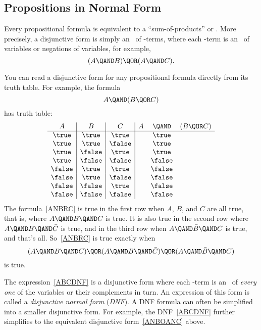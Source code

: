 \subsection{Propositions in Normal Form}\label{normal_form_sec}
Every propositional formula is equivalent to a ``sum-of-products''
or .  More precisely, a disjunctive form is
simply an \QOR\ of \QAND-terms, where each \QAND-term is an \QAND\ of
variables or negations of variables, for example, 
\begin{equation}\label{ANBOANC}
(A \QAND B) \QOR (A \QAND C).
\end{equation}

You can read a disjunctive form for any propositional formula directly
from its truth table.  For example, the formula
\begin{equation}\label{ANBRC}
A \QAND (B \QOR C)
\end{equation}
has truth table:
\[\begin{array}{c|c|c|ccc}
A      & B      & C       & A & \QAND & (B \QOR C)\label{ANBRCTT}\\
\hline \true  & \true  & \true   &   &  \true\\
\true  & \true  & \false  &   &  \true\\
\true  & \false & \true   &   &  \true\\
\true  & \false & \false  &   &  \false\\
\false & \true  & \true   &   &  \false\\
\false & \true  & \false  &   &  \false\\
\false & \false & \true   &   &  \false\\
\false & \false & \false  &   &  \false
\end{array}\]
The formula~\eqref{ANBRC} is true in the first row when $A$, $B$, and
$C$ are all true, that is, where $A \QAND B \QAND C$ is true.  It is
also true in the second row where $A \QAND B \QAND \bar{C}$ is true,
and in the third row when $A \QAND \bar{B} \QAND C$ is true, and
that's all.  So~\eqref{ANBRC} is true exactly when
\begin{equation}\label{ABCDNF}
(A \QAND B \QAND C) \QOR (A \QAND B \QAND \bar{C}) \QOR
  (A \QAND \bar{B} \QAND C)
\end{equation}
is true.

The expression~\eqref{ABCDNF} is a disjunctive form where each
\QAND-term is an \QAND\ of \emph{every one} of the variables or their
complements in turn.  An expression of this form is called a
\emph{disjunctive normal form}%
%
(\emph{DNF}).  A DNF formula can often
be simplified into a smaller disjunctive form.  For example, the
DNF~\eqref{ABCDNF} further simplifies to the equivalent disjunctive
form~\eqref{ANBOANC} above.

